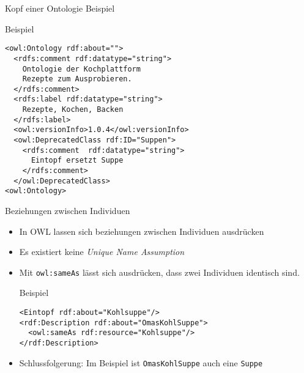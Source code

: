 \documentclass{beamer}
\begin{document}
\begin{frame}[fragile]{Kopf einer Ontologie Beispiel}
\begin{block}{Beispiel}
\begin{lstlisting}[lang="xml"]
<owl:Ontology rdf:about=""> 
  <rdfs:comment rdf:datatype="string">
    Ontologie der Kochplattform 
    Rezepte zum Ausprobieren.		
  </rdfs:comment>
  <rdfs:label rdf:datatype="string">
    Rezepte, Kochen, Backen
  </rdfs:label>
  <owl:versionInfo>1.0.4</owl:versionInfo>
  <owl:DeprecatedClass rdf:ID="Suppen">
    <rdfs:comment  rdf:datatype="string">
      Eintopf ersetzt Suppe
    </rdfs:comment>
  </owl:DeprecatedClass>
<owl:Ontology>
\end{lstlisting}
\end{block}
\end{frame}



\begin{frame}[fragile]{Beziehungen zwischen Individuen}
\begin{itemize}
\item In OWL lassen sich beziehungen zwischen Individuen ausdrücken
\item Es existiert keine \emph{Unique Name Assumption}
\item Mit \texttt{owl:sameAs} lässt sich ausdrücken, dass zwei
Individuen identisch sind.

\begin{exampleblock}{Beispiel}
\begin{lstlisting}[lang="xml"]
<Eintopf rdf:about="Kohlsuppe"/>
<rdf:Description rdf:about="OmasKohlSuppe">
  <owl:sameAs rdf:resource="Kohlsuppe"/>
</rdf:Description>
\end{lstlisting}
\end{exampleblock}
\item \alert{Schlussfolgerung:} Im Beispiel ist \texttt{OmasKohlSuppe} auch eine
\texttt{Suppe}
\end{itemize}
\end{frame}
\end{document}
